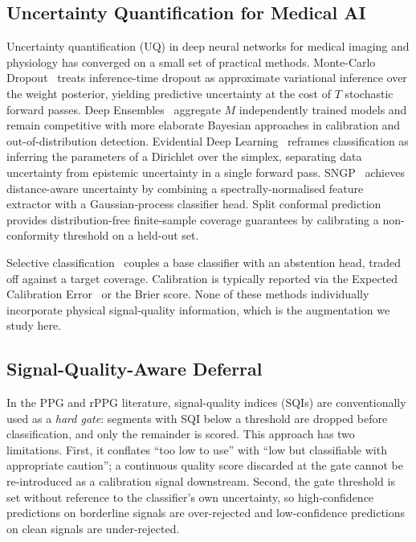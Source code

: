 \documentclass[journal]{IEEEtran}
\begin{document}
\subsection{Uncertainty Quantification for Medical AI}
Uncertainty quantification (UQ) in deep neural networks for medical imaging and physiology has converged on a small set of practical methods. Monte-Carlo Dropout~\cite{galghahramani2016dropout} treats inference-time dropout as approximate variational inference over the weight posterior, yielding predictive uncertainty at the cost of $T$ stochastic forward passes. Deep Ensembles~\cite{lakshminarayanan2017ensembles} aggregate $M$ independently trained models and remain competitive with more elaborate Bayesian approaches in calibration and out-of-distribution detection. Evidential Deep Learning~\cite{sensoy2018evidential} reframes classification as inferring the parameters of a Dirichlet over the simplex, separating data uncertainty from epistemic uncertainty in a single forward pass. SNGP~\cite{liu2020sngp} achieves distance-aware uncertainty by combining a spectrally-normalised feature extractor with a Gaussian-process classifier head. Split conformal prediction~\cite{angelopoulos2021conformal} provides distribution-free finite-sample coverage guarantees by calibrating a non-conformity threshold on a held-out set.

Selective classification~\cite{geifman2017selective} couples a base classifier with an abstention head, traded off against a target coverage. Calibration is typically reported via the Expected Calibration Error~\cite{naeini2015ece} or the Brier score. None of these methods individually incorporate physical signal-quality information, which is the augmentation we study here.

\subsection{Signal-Quality-Aware Deferral}
In the PPG and rPPG literature, signal-quality indices (SQIs) are conventionally used as a \emph{hard gate}: segments with SQI below a threshold are dropped before classification, and only the remainder is scored. This approach has two limitations. First, it conflates ``too low to use'' with ``low but classifiable with appropriate caution''; a continuous quality score discarded at the gate cannot be re-introduced as a calibration signal downstream. Second, the gate threshold is set without reference to the classifier's own uncertainty, so high-confidence predictions on borderline signals are over-rejected and low-confidence predictions on clean signals are under-rejected.
\end{document}
